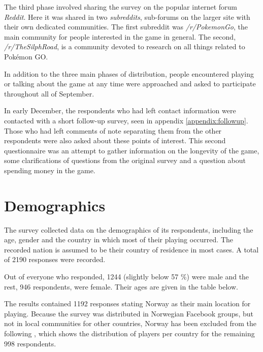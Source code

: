 The third phase involved sharing the survey on the popular internet forum \emph{Reddit}. Here it was shared in two \emph{subreddits}, sub-forums on the larger site with their own dedicated communities. The first subreddit was \emph{/r/PokemonGo}, the main community for people interested in the game in general. The second, \emph{/r/TheSilphRoad}, is a community devoted to research on all things related to Pokémon GO.

In addition to the three main phases of distribution, people encountered playing or talking about the game at any time were approached and asked to participate throughout all of September.

In early December, the respondents who had left contact information were contacted with a short follow-up survey, seen in appendix \ref{appendix:followup}. Those who had left comments of note separating them from the other respondents were also asked about these points of interest. This second questionnaire was an attempt to gather information on the longevity of the game, some clarifications of questions from the original survey and a question about spending money in the game. 


\section{Demographics}


The survey collected data on the demographics of its respondents, including the age, gender and the country in which most of their playing occurred. The recorded nation is assumed to be their country of residence in most cases. A total of 2190 responses were recorded.

Out of everyone who responded, 1244 (slightly below 57 \%) were male and the rest, 946 respondents, were female. Their ages are given in the table below.


The results contained 1192 responses stating Norway as their main location for playing. Because the survey was distributed in Norwegian Facebook groups, but not in local communities for other countries, Norway has been excluded from the following , which shows the distribution of players per country for the remaining 998 respondents.

